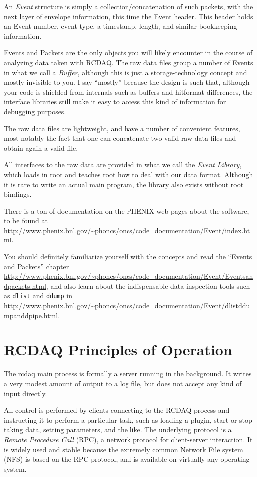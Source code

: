 \documentclass{article}[11pt]
\begin{document}
An \emph{Event} structure is simply a collection/concatenation of such
packets, with the next layer of envelope information, this time the
Event header. This header holds an Event number, event type, a timestamp,
length, and similar bookkeeping information.

Events and Packets are the only objects you will likely encounter in
the course of analyzing data taken with RCDAQ. The raw data files
group a number of Events in what we call a \emph{Buffer}, although
this is just a storage-technology concept and mostly invisible to
you. I say ``mostly'' because the design is such that, although your
code is shielded from internals such as buffers and hitformat
differences, the interface libraries still make it easy to access this
kind of information for debugging purposes.

The raw data files are lightweight, and have a number of convenient
features, most notably the fact that one can concatenate two valid 
raw data files and obtain again a valid file.

All interfaces to the raw data are provided in what we call the
\emph{Event Library}, which loads in root and teaches root how to deal
with our data format. Although it is rare to write an actual main
program, the library also exists without root bindings. 

There is a ton of documentation on the PHENIX web pages about the software, to be
found at 
\url{http://www.phenix.bnl.gov/~phoncs/oncs/code_documentation/Event/index.html}.

You should definitely familiarize yourself with the concepts and read
the ``Events and Packets'' chapter
\url{http://www.phenix.bnl.gov/~phoncs/oncs/code_documentation/Event/Eventsandpackets.html},
and also learn about the indispensable data inspection tools such as
\verb|dlist| and \verb|ddump| in 
\url{http://www.phenix.bnl.gov/~phoncs/oncs/code_documentation/Event/dlistddumpanddpipe.html}.



\section{RCDAQ Principles of Operation}

The rcdaq main process is formally a server running in the
background. It writes a very modest amount of output to a log file,
but does not accept any kind of input directly.

All control is performed by clients connecting to the RCDAQ process
and instructing it to perform a particular task, such as loading a
plugin, start or stop taking data, setting parameters, and the
like. The underlying protocol is a \emph{Remote Procedure Call} (RPC),
a network protocol for client-server interaction. It is widely used
and stable because the extremely common Network File system (NFS) is
based on the RPC protocol, and is available on virtually any operating
system.
\end{document}
